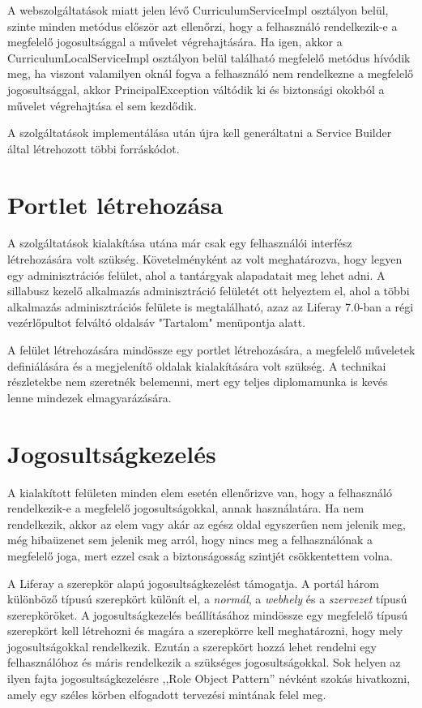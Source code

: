 \documentclass[hidelinks, 12pt, a4paper]{report}
\begin{document}
A webszolgáltatások miatt jelen lévő CurriculumServiceImpl osztályon belül, szinte minden metódus először azt ellenőrzi, hogy a felhasználó rendelkezik-e a megfelelő jogosultsággal a művelet végrehajtására. Ha igen, akkor a CurriculumLocalServiceImpl osztályon belül található megfelelő metódus hívódik meg, ha viszont valamilyen oknál fogva a felhasználó nem rendelkezne a megfelelő jogosultsággal, akkor PrincipalException váltódik ki és biztonsági okokból a művelet végrehajtása el sem kezdődik.

A szolgáltatások implementálása után újra kell generáltatni a Service Builder által létrehozott többi forráskódot.

\section{Portlet létrehozása}

A szolgáltatások kialakítása utána már csak egy felhasználói interfész létrehozására volt szükség. Követelményként az volt meghatározva, hogy legyen egy adminisztrációs felület, ahol a tantárgyak alapadatait meg lehet adni. A sillabusz kezelő alkalmazás adminisztráció felületét ott helyeztem el, ahol a többi alkalmazás adminisztrációs felülete is megtalálható, azaz az Liferay 7.0-ban a régi vezérlőpultot felváltó oldalsáv "Tartalom" menüpontja alatt.

A felület létrehozására mindössze egy portlet létrehozására, a megfelelő műveletek definiálására és a megjelenítő oldalak kialakítására volt szükség. A technikai részletekbe nem szeretnék belemenni, mert egy teljes diplomamunka is kevés lenne mindezek elmagyarázására.

\section{Jogosultságkezelés}

A kialakított felületen minden elem esetén ellenőrizve van, hogy a felhasználó rendelkezik-e a megfelelő jogosultságokkal, annak használatára. Ha nem rendelkezik, akkor az elem vagy akár az egész oldal egyszerűen nem jelenik meg, még hibaüzenet sem jelenik meg arról, hogy nincs meg a felhasználónak a megfelelő joga, mert ezzel csak a biztonságosság szintjét csökkentettem volna.

A Liferay a szerepkör alapú jogosultságkezelést támogatja. A portál három különböző típusú szerepkört különít el, a \emph{normál}, a \emph{webhely} és a \emph{szervezet} típusú szerepköröket. A jogosultságkezelés beállításához mindössze egy megfelelő típusú szerepkört kell létrehozni és magára a szerepkörre kell meghatározni, hogy mely jogosultságokkal rendelkezik. Ezután a szerepkört hozzá lehet rendelni egy felhasználóhoz és máris rendelkezik a szükséges jogosultságokkal. Sok helyen az ilyen fajta jogosultságkezelésre ,,Role Object Pattern'' névként szokás hivatkozni, amely egy széles körben elfogadott tervezési mintának felel meg.
\end{document}
